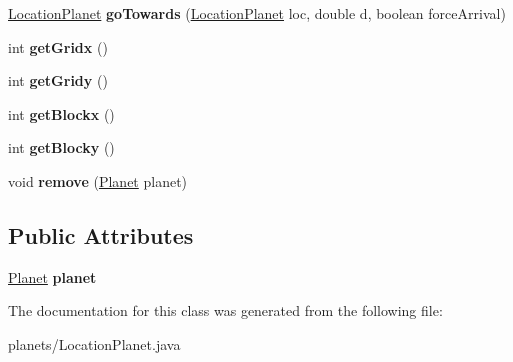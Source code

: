 \begin{DoxyCompactItemize}
\item 
\hyperlink{classplanets_1_1_location_planet}{Location\+Planet} {\bfseries go\+Towards} (\hyperlink{classplanets_1_1_location_planet}{Location\+Planet} loc, double d, boolean force\+Arrival)\hypertarget{classplanets_1_1_location_planet_ad36c7f854b6602f5724da8b78fad5bc2}{}\label{classplanets_1_1_location_planet_ad36c7f854b6602f5724da8b78fad5bc2}

\item 
int {\bfseries get\+Gridx} ()\hypertarget{classplanets_1_1_location_planet_add7591fe2fe5e05ed257fd4601db4a88}{}\label{classplanets_1_1_location_planet_add7591fe2fe5e05ed257fd4601db4a88}

\item 
int {\bfseries get\+Gridy} ()\hypertarget{classplanets_1_1_location_planet_a977a834f6159b2246ef424abadc2d0a6}{}\label{classplanets_1_1_location_planet_a977a834f6159b2246ef424abadc2d0a6}

\item 
int {\bfseries get\+Blockx} ()\hypertarget{classplanets_1_1_location_planet_a49e46f037a769ce6b9c50511f915d573}{}\label{classplanets_1_1_location_planet_a49e46f037a769ce6b9c50511f915d573}

\item 
int {\bfseries get\+Blocky} ()\hypertarget{classplanets_1_1_location_planet_a1ba55bc726b42400fb9dec100ab03657}{}\label{classplanets_1_1_location_planet_a1ba55bc726b42400fb9dec100ab03657}

\item 
void {\bfseries remove} (\hyperlink{classplanets_1_1_planet}{Planet} planet)\hypertarget{classplanets_1_1_location_planet_adf63840175c136b6685887f7296e3840}{}\label{classplanets_1_1_location_planet_adf63840175c136b6685887f7296e3840}

\end{DoxyCompactItemize}
\subsection*{Public Attributes}
\begin{DoxyCompactItemize}
\item 
\hyperlink{classplanets_1_1_planet}{Planet} {\bfseries planet}\hypertarget{classplanets_1_1_location_planet_a417ffee5838f02fac79e3073b715f4c1}{}\label{classplanets_1_1_location_planet_a417ffee5838f02fac79e3073b715f4c1}

\end{DoxyCompactItemize}


The documentation for this class was generated from the following file\+:\begin{DoxyCompactItemize}
\item 
planets/Location\+Planet.\+java\end{DoxyCompactItemize}
